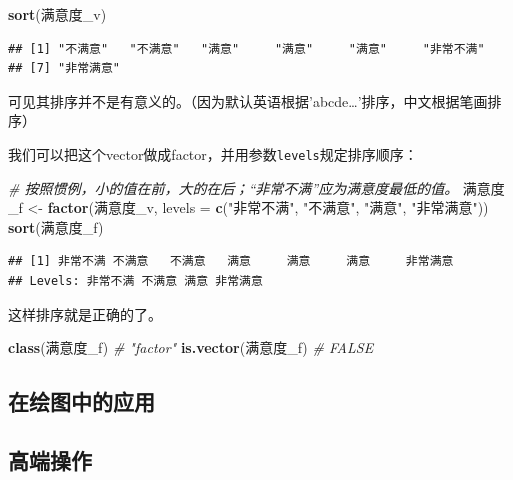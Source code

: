 \documentclass[]{book}
\newenvironment{Shaded}{\begin{snugshade}}{\end{snugshade}}
\newcommand{\CommentTok}[1]{\textcolor[rgb]{0.56,0.35,0.01}{\textit{#1}}}
\newcommand{\DataTypeTok}[1]{\textcolor[rgb]{0.13,0.29,0.53}{#1}}
\newcommand{\KeywordTok}[1]{\textcolor[rgb]{0.13,0.29,0.53}{\textbf{#1}}}
\newcommand{\NormalTok}[1]{#1}
\newcommand{\StringTok}[1]{\textcolor[rgb]{0.31,0.60,0.02}{#1}}
\begin{document}
\begin{Shaded}
\begin{Highlighting}[]
\KeywordTok{sort}\NormalTok{(满意度_v)}
\end{Highlighting}
\end{Shaded}

\begin{verbatim}
## [1] "不满意"   "不满意"   "满意"     "满意"     "满意"     "非常不满"
## [7] "非常满意"
\end{verbatim}

可见其排序并不是有意义的。（因为默认英语根据'abcde\ldots{}'排序，中文根据笔画排序）

我们可以把这个vector做成factor，并用参数\texttt{levels}规定排序顺序：

\begin{Shaded}
\begin{Highlighting}[]
\CommentTok{# 按照惯例，小的值在前，大的在后；“非常不满”应为满意度最低的值。}
\NormalTok{满意度_f <-}\StringTok{ }\KeywordTok{factor}\NormalTok{(满意度_v, }\DataTypeTok{levels =} \KeywordTok{c}\NormalTok{(}\StringTok{"非常不满"}\NormalTok{, }\StringTok{"不满意"}\NormalTok{, }\StringTok{"满意"}\NormalTok{, }\StringTok{"非常满意"}\NormalTok{))}
\KeywordTok{sort}\NormalTok{(满意度_f)}
\end{Highlighting}
\end{Shaded}

\begin{verbatim}
## [1] 非常不满 不满意   不满意   满意     满意     满意     非常满意
## Levels: 非常不满 不满意 满意 非常满意
\end{verbatim}

这样排序就是正确的了。

\begin{Shaded}
\begin{Highlighting}[]
\KeywordTok{class}\NormalTok{(满意度_f) }\CommentTok{# "factor"}
\KeywordTok{is.vector}\NormalTok{(满意度_f) }\CommentTok{# FALSE}
\end{Highlighting}
\end{Shaded}

\subsection{在绘图中的应用}

\subsection{高端操作}
\end{document}
